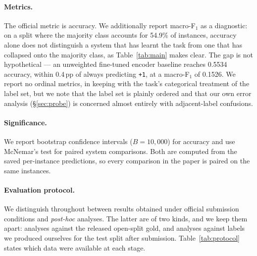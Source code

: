 \paragraph{Metrics.}
The official metric is accuracy. We additionally report macro-F$_1$ as
a diagnostic: on a split where the majority class accounts for 54.9\%
of instances, accuracy alone does not distinguish a system that has
learnt the task from one that has collapsed onto the majority class, as
Table~\ref{tab:main} makes clear. The gap is not hypothetical --- an
unweighted fine-tuned encoder baseline reaches 0.5534 accuracy, within
0.4\,pp of always predicting \texttt{+1}, at a macro-F$_1$ of 0.1526.
We report no ordinal metrics, in keeping with the task's categorical
treatment of the label set, but we note that the label set is plainly
ordered and that our own error analysis (\S\ref{sec:probe}) is
concerned almost entirely with adjacent-label confusions.

\paragraph{Significance.}
We report bootstrap confidence intervals ($B{=}10{,}000$) for accuracy
and use McNemar's test for paired system comparisons. Both are
computed from the saved per-instance predictions, so every comparison
in the paper is paired on the same instances.

\paragraph{Evaluation protocol.}
We distinguish throughout between results obtained under official
submission conditions and \emph{post-hoc} analyses. The latter are of
two kinds, and we keep them apart: analyses against the released
open-split gold, and analyses against labels we produced ourselves for
the test split after submission. Table~\ref{tab:protocol} states which
data were available at each stage.

